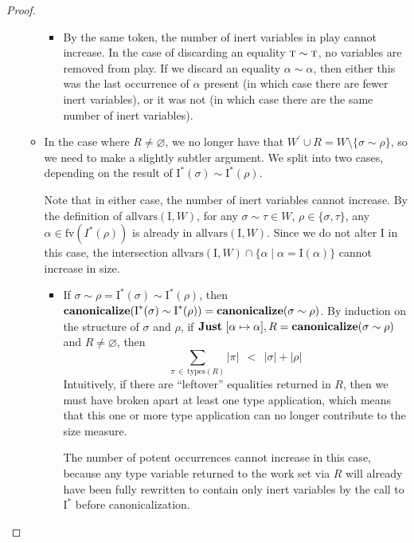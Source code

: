 \documentclass[10pt, letterpaper, oneside]{article}
\newcommand{\inertset}{\text{I}}
\newcommand{\fv}{\mathrm{fv}}
\begin{document}
\begin{proof}
\begin{itemize}
\begin{itemize}
\begin{itemize}
        \item By the same token, the number of inert variables in play cannot increase. In the case of discarding an equality \(\text{\sc t} \sim \text{\sc t}\), no variables are removed from play. If we discard an equality \(\alpha \sim \alpha\), then either this was the last occurrence of \(\alpha\) present (in which case there are fewer inert variables), or it was not (in which case there are the same number of inert variables).

      \end{itemize}

      \item In the case where \(R \ne \varnothing\), we no longer have that \(W^\prime \cup R = W \setminus \{\sigma \sim \rho\}\), so we need to make a slightly subtler argument. We split into two cases, depending on the result of \(\inertset^\ast(\sigma) \sim \inertset^\ast(\rho)\).

      Note that in either case, the number of inert variables cannot increase. By the definition of \(\text{allvars}(\inertset, W)\), for any \(\sigma \sim \tau \in W\), \(\rho \in \{\sigma, \tau\}\), any \(\alpha \in \fv(I^\ast(\rho))\) is already in \(\text{allvars}(\inertset, W)\). Since we do not alter \(\inertset\) in this case, the intersection \(\text{allvars}(\inertset, W) \cap \{\alpha \mid \alpha = \inertset(\alpha)\}\) cannot increase in size.

      \begin{itemize}

        \item If \(\sigma \sim \rho = \inertset^\ast(\sigma) \sim \inertset^\ast(\rho)\), then \(\text{\bf canonicalize}(\inertset^\ast(\sigma) \sim \inertset^\ast(\rho)) = \text{\bf canonicalize}(\sigma \sim \rho)\). By induction on the structure of \(\sigma\) and \(\rho\), if \(\text{\bf Just}~[\alpha \mapsto \alpha], R = \text{\bf canonicalize}(\sigma \sim \rho)\) and \(R \ne \varnothing\), then
        \begin{equation*}
          \sum_{\pi\,\in\,\text{types}(R)}\!\!\!\!\!\!\!\!|\pi|\ \ <\ \ |\sigma| + |\rho|
        \end{equation*}
        Intuitively, if there are ``leftover'' equalities returned in \(R\), then we must have broken apart at least one type application, which means that this one or more type application can no longer contribute to the size measure.

        The number of potent occurrences cannot increase in this case, because any type variable returned to the work set via \(R\) will already have been fully rewritten to contain only inert variables by the call to \(\inertset^\ast\) before canonicalization.


\end{itemize}
\end{itemize}
\end{itemize}
\end{proof}
\end{document}
